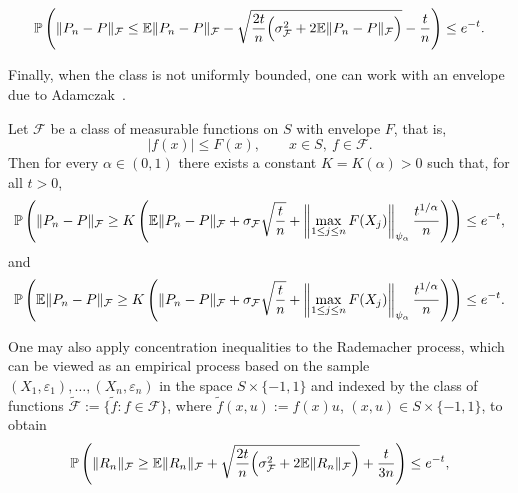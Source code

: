 \begin{theorem}\label{thm:klein-rio}
  \[
    \mathbb{P}\left(
    \|P_n-P\|_{\mathcal F}
    \le
    \mathbb{E}\|P_n-P\|_{\mathcal F}
    -\sqrt{\frac{2t}{n}\Bigl(\sigma_{\mathcal F}^2+2\mathbb{E}\|P_n-P\|_{\mathcal F}\Bigr)}
    -\frac{t}{n}
    \right)
    \le e^{-t}.
  \]
\end{theorem}

Finally, when the class is not uniformly bounded, one can work with an envelope due to Adamczak~\cite{adamczak2008tail}.

\begin{theorem}[Adamczak]\label{thm:adamczak}
  Let $\mathcal F$ be a class of measurable functions on $S$ with envelope $F$, that is,
  \[
    |f(x)|\le F(x), \qquad x\in S,\ f\in\mathcal F.
  \]
  Then for every $\alpha\in(0,1)$ there exists a constant $K=K(\alpha)>0$ such that, for all $t>0$,
  \[
    \mathbb{P}\left(
    \|P_n-P\|_{\mathcal F}
    \ge
    K\left(
    \mathbb{E}\|P_n-P\|_{\mathcal F}
    +\sigma_{\mathcal F}\sqrt{\frac{t}{n}}
    +\left\|\max_{1\le j\le n}F(X_j)\right\|_{\psi_{\alpha}}\frac{t^{1/\alpha}}{n}
    \right)
    \right)
    \le e^{-t},
  \]
  and
  \[
    \mathbb{P}\left(
    \mathbb{E}\|P_n-P\|_{\mathcal F}
    \ge
    K\left(
    \|P_n-P\|_{\mathcal F}
    +\sigma_{\mathcal F}\sqrt{\frac{t}{n}}
    +\left\|\max_{1\le j\le n}F(X_j)\right\|_{\psi_{\alpha}}\frac{t^{1/\alpha}}{n}
    \right)
    \right)
    \le e^{-t}.
  \]
\end{theorem}

One may also apply concentration inequalities to the Rademacher process, which can be viewed as an empirical process based on the sample $(X_1,\varepsilon_1),\ldots,(X_n,\varepsilon_n)$ in the space $S\times\{-1,1\}$ and indexed by the class of functions $\tilde{\mathcal F}:=\{\tilde{f}:f\in\mathcal F\}$, where $\tilde{f}(x,u):=f(x)u$, $(x,u)\in S\times\{-1,1\}$, to obtain
\begin{equation}\label{eq:apprad}
  \mathbb{P}\left(
  \|R_n\|_{\mathcal F}
  \ge
  \mathbb{E}\|R_n\|_{\mathcal F}
  +\sqrt{\frac{2t}{n}\Bigl(\sigma_{\mathcal F}^2+2\mathbb{E}\|R_n\|_{\mathcal F}\Bigr)}
  +\frac{t}{3n}
  \right)
  \le e^{-t},
\end{equation}







